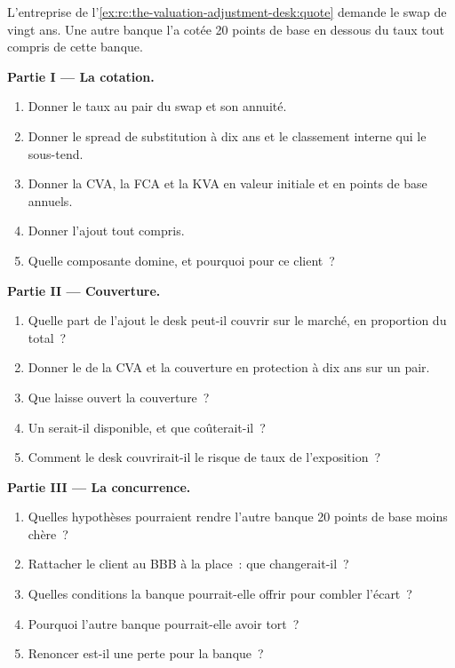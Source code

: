 \begin{problem}\label{pb:rc:the-valuation-adjustment-desk:1}
L'entreprise de l'\cref{ex:rc:the-valuation-adjustment-desk:quote} demande le swap de vingt ans.
Une autre banque l'a cotée 20 points de base en dessous du taux tout compris de cette banque.

\medskip\noindent\textbf{Partie I --- La cotation.}
\begin{enumerate}
\item Donner le taux au pair du swap et son annuité.
\item Donner le spread de substitution à dix ans et le classement interne qui le sous-tend.
\item Donner la CVA, la FCA et la KVA en valeur initiale et en points de base annuels.
\item Donner l'ajout tout compris.
\item Quelle composante domine, et pourquoi pour ce client~?
\end{enumerate}

\medskip\noindent\textbf{Partie II --- Couverture.}
\begin{enumerate}[resume]
\item Quelle part de l'ajout le desk peut-il couvrir sur le marché, en proportion du total~?
\item Donner le  de la CVA et la couverture en protection à dix ans sur un pair.
\item Que laisse ouvert la couverture~?
\item Un  serait-il disponible, et que coûterait-il~?
\item Comment le desk couvrirait-il le risque de taux de l'exposition~?
\end{enumerate}

\medskip\noindent\textbf{Partie III --- La concurrence.}
\begin{enumerate}[resume]
\item Quelles hypothèses pourraient rendre l'autre banque 20 points de base moins chère~?
\item Rattacher le client au BBB à la place~: que changerait-il~?
\item Quelles conditions la banque pourrait-elle offrir pour combler l'écart~?
\item Pourquoi l'autre banque pourrait-elle avoir tort~?
\item Renoncer est-il une perte pour la banque~?
\end{enumerate}


\end{problem}
